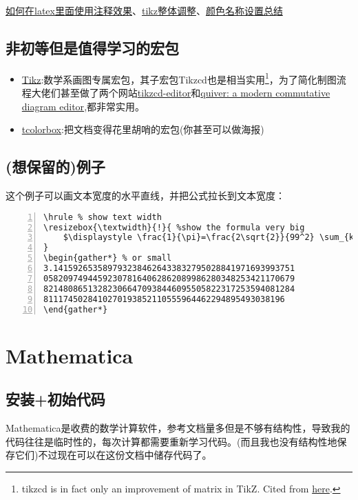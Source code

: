 \documentclass[11pt]{amsart}
\begin{document}
\href{https://liam.page/2016/09/24/TikZ-comment-to-text/}{如何在latex里面使用注释效果}、\href{https://newbedev.com/how-of-to-change-font-size-for-every-nodes-in-tikzcd}{tikz整体调整}、\href{http://latexcolor.com/}{颜色名称设置总结}
\subsection{非初等但是值得学习的宏包}
\begin{itemize}
\item \href{https://ctan.org/pkg/pgf}{Tikz}:数学系画图专属宏包，其子宏包Tikzcd也是相当实用\footnote{tikzcd is in fact only an improvement of matrix in TikZ. Cited from \href{https://tex.stackexchange.com/questions/484743/format-single-node-in-tikzcd}{here}.}，为了简化制图流程大佬们甚至做了两个网站\href{https://tikzcd.yichuanshen.de/}{tikzcd-editor}和\href{https://q.uiver.app/}{quiver: a modern commutative diagram editor},都非常实用。 
\item \href{https://ctan.org/pkg/tcolorbox}{tcolorbox}:把文档变得花里胡哨的宏包(你甚至可以做海报)
\end{itemize}
\subsection{(想保留的)例子}
这个例子可以画文本宽度的水平直线，并把公式拉长到文本宽度：
\begin{lstlisting}[numbers=left,numberstyle=\tiny,numbersep=10pt]
\hrule % show text width
\resizebox{\textwidth}{!}{ %show the formula very big
	$\displaystyle \frac{1}{\pi}=\frac{2\sqrt{2}}{99^2} \sum_{k=0}^{\infty} \frac{(4k)!}{k!^4}\frac{26390k+1103}{396^{4k}} $
}
\begin{gather*} % or small
3.1415926535897932384626433832795028841971693993751
058209749445923078164062862089986280348253421170679
821480865132823066470938446095505822317253594081284
8111745028410270193852110555964462294895493038196
\end{gather*}
\end{lstlisting}
\section{Mathematica}
\subsection{安装+初始代码}
Mathematica是收费的数学计算软件，参考文档量多但是不够有结构性，导致我的代码往往是临时性的，每次计算都需要重新学习代码。(而且我也没有结构性地保存它们)不过现在可以在这份文档中储存代码了。
\end{document}
